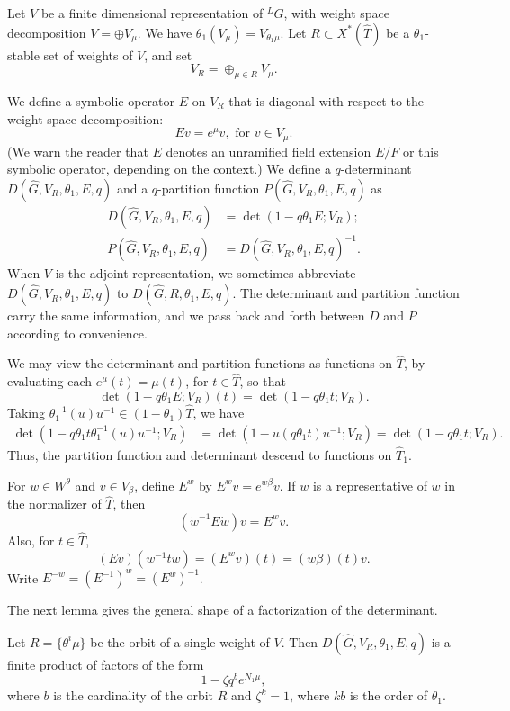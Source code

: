 Let $V$ be a finite dimensional representation of ${}^LG$, with
weight space decomposition 
$V=\oplus V_\mu$.  We have
$\theta_1(V_\mu) = V_{\theta_1\mu}$.  Let $R\subset X^*(\hat T)$ be a
$\theta_1$-stable set of weights of $V$, and set
\begin{equation}\label{eqn:VR}
V_R = \oplus_{\mu\in R} V_\mu.
\end{equation}

We define a symbolic operator $E$ on $V_R$ that is diagonal with
respect to the weight space decomposition:
\[
E v = e^{\mu} v, \text{ for } v \in V_\mu.
\]
(We warn the reader that $E$ denotes an unramified field extension $E/F$
or this symbolic operator, depending on the context.)
We define a $q$-determinant $D(\hat G,V_R,\theta_1,E,q)$ and a
$q$-partition function $P(\hat G,V_R,\theta_1,E,q)$ as
\begin{align}\label{eqn:det}
D(\hat G,V_R,\theta_1,E,q) &= \det(1- q \theta_1 E;V_R);\\ 
P(\hat G,V_R,\theta_1,E,q) &= D(\hat G,V_R,\theta_1,E,q)^{-1}.
\end{align}
When $V$ is the adjoint representation, we sometimes abbreviate
$D(\hat G,V_R,\theta_1,E,q)$ to $D(\hat G,R,\theta_1,E,q)$.  The
determinant and partition function carry the same information, and we
pass back and forth between $D$ and $P$ according to convenience.

We may view the determinant and partition functions as functions on
$\hat T$, by evaluating each $e^\mu (t) = \mu(t)$, for $t\in \hat T$,
so that
\[
\det(1- q\theta_1 E;V_R)(t) = \det(1-q\theta_1 t;V_R).
\]
Taking $\theta_1^{-1}(u) u^{-1}\in (1-\theta_1)\hat T$, we have
\begin{align*}
\det (1-q \theta_1 t \theta_1^{-1}(u) u^{-1};V_R) 
&= \det(1- u (q \theta_1 t ) u^{-1};V_R) = \det(1-q\theta_1 t;V_R).
\end{align*}
Thus, the partition function and determinant descend to functions on
$\hat T_1$.  

For $w\in W^\theta$ and $v\in V_\beta$, define $E^w$ by $E^w v =
e^{w\beta} v$.  If $\dot w$ is a representative of $w$ in the
normalizer of $\hat T$, then
\[
(\dot w^{-1} E \dot w) v = E^w v.
\]
Also, for $t\in \hat T$,
\[
(E v) (w^{-1} t w) = (E^w v) (t) = (w\beta)(t) v.
\]
Write $E^{-w} = (E^{-1})^w = (E^w)^{-1}$.


The next lemma gives the general shape of a factorization
of the determinant.

\begin{lemma}\label{lemma:fact}  
  Let $R = \{\theta^i\mu\}$ be the orbit of a single weight of $V$.
  Then $D(\hat G,V_R,\theta_1,E,q)$ is a finite product of factors of
  the form
\[
1 - \zeta q^b e^{N_1\mu},
\]
where $b$ is the cardinality of the orbit $R$ and $\zeta^k=1$, where
$k b$ is the order of $\theta_1$.
\end{lemma}

